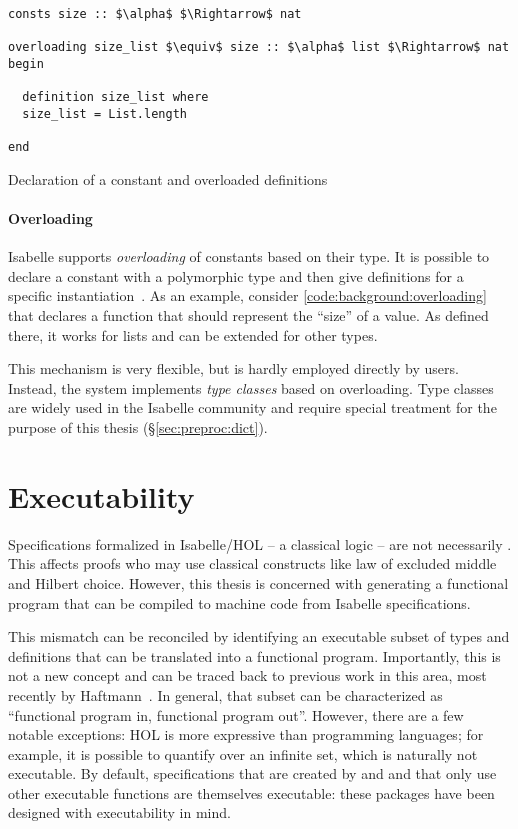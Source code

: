 \begin{code}
  \begin{lstlisting}
consts size :: $\alpha$ $\Rightarrow$ nat

overloading size_list $\equiv$ size :: $\alpha$ list $\Rightarrow$ nat
begin

  definition size_list where
  size_list = List.length

end
  \end{lstlisting}
  \caption{Declaration of a constant and overloaded definitions}
  \label{code:background:overloading}
\end{code}

\paragraph{Overloading}
Isabelle supports \emph{overloading} of constants based on their type.
It is possible to declare a constant with a polymorphic type and then give definitions for a specific instantiation~\cite{kuncar2018consistent}.
As an example, consider \cref{code:background:overloading} that declares a function that should represent the ``size'' of a value.
As defined there, it works for lists and can be extended for other types.

This mechanism is very flexible, but is hardly employed directly by users.
Instead, the system implements \emph{type classes} based on overloading.
Type classes are widely used in the Isabelle community and require special treatment for the purpose of this thesis (§\ref{sec:preproc:dict}).

\section{Executability}
\label{sec:background:code}

Specifications formalized in Isabelle/HOL -- a classical logic -- are not necessarily .
This affects proofs who may use classical constructs like law of excluded middle and Hilbert choice.
However, this thesis is concerned with generating a functional program that can be compiled to machine code from Isabelle specifications.

This mismatch can be reconciled by identifying an executable subset of types and definitions that can be translated into a functional program.
Importantly, this is not a new concept and can be traced back to previous work in this area, most recently by Haftmann~\cite{haftmann2010codegeneration,haftmann2010haskell}.
In general, that subset can be characterized as ``functional program in, functional program out''.
However, there are a few notable exceptions:
HOL is more expressive than programming languages; for example, it is possible to quantify over an infinite set, which is naturally not executable.
By default, specifications that are created by  and  and that only use other executable functions are themselves executable:
these packages have been designed with executability in mind.

